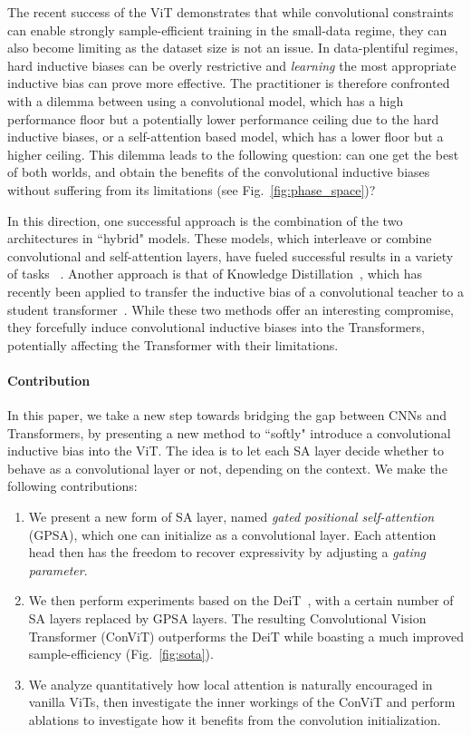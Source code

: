 \documentclass[a4paper,11pt,twocolumn]{article}
\begin{document}
The recent success of the ViT demonstrates that while convolutional constraints can enable strongly sample-efficient training in the small-data regime, they can also become limiting as the dataset size is not an issue. In data-plentiful regimes, hard inductive biases can be overly restrictive and \textit{learning} the most appropriate inductive bias can prove more effective. The practitioner is therefore confronted with a dilemma between using a convolutional model, which has a high performance floor but a potentially lower performance ceiling due to the hard inductive biases, or a self-attention based model, which has a lower floor but a higher ceiling. This dilemma leads to the following question: can one get the best of both worlds, and obtain the benefits of the convolutional inductive biases without suffering from its limitations (see Fig.~\ref{fig:phase_space})?

In this direction, one successful approach is the combination of the two architectures in ``hybrid" models. These models, which interleave or combine convolutional and self-attention layers, have fueled successful results in a variety of tasks ~\cite{carion2020end,hu2018relation,ramachandran2019stand,chen2020uniter,locatello2020object,sun2019videobert,srinivas20201bottleneck,wu_visual_2020}. Another approach is that of Knowledge Distillation~\cite{hinton2015distilling}, which has recently been applied to transfer the inductive bias of a convolutional teacher to a student transformer~\cite{touvron2020training}. While these two methods offer an interesting compromise, they forcefully induce convolutional inductive biases into the Transformers, potentially affecting the Transformer with their limitations. 

\paragraph{Contribution}
In this paper, we take a new step towards bridging the gap between CNNs and Transformers, by presenting a new method to ``softly" introduce a convolutional inductive bias into the ViT. The idea is to let each SA layer decide whether to behave as a convolutional layer or not, depending on the context. We make the following contributions:
\begin{enumerate}[noitemsep,labelindent=0pt]
    \item We present a new form of SA layer, named \emph{gated positional self-attention} (GPSA), which one can initialize as a convolutional layer. Each attention head then has the freedom to recover expressivity by adjusting a \emph{gating parameter}.
    \item We then perform experiments based on the DeiT~\cite{touvron2020training}, with a certain number of SA layers replaced by GPSA layers. The resulting Convolutional Vision Transformer (ConViT) outperforms the DeiT while boasting a much improved sample-efficiency (Fig.~\ref{fig:sota}). 
    \item We analyze quantitatively how local attention is naturally encouraged in vanilla ViTs, then investigate the inner workings of the ConViT and perform ablations to investigate how it benefits from the convolution initialization.
\end{enumerate}
\end{document}
